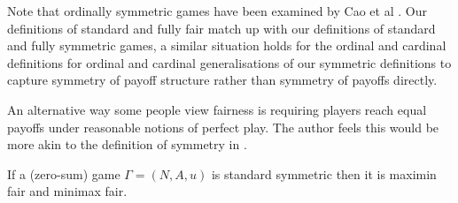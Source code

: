 Note that ordinally symmetric games have been examined by Cao et al \cite{cao2018symmetric, cao2019ordinally}. Our definitions of standard and fully fair match up with our definitions of standard and fully symmetric games, a similar situation holds for the ordinal and cardinal definitions for ordinal and cardinal generalisations of our symmetric definitions to capture symmetry of payoff structure rather than symmetry of payoffs directly. 

An alternative way some people view fairness is requiring players reach equal payoffs under reasonable notions of perfect play. The author feels this would be more akin to the definition of symmetry in \cite{DMaskin}.

\begin{proposition} \label{prop:standsymgamesaremaxminandminmaxfair}
	If a (zero-sum) game $\Gamma = (N, A, u)$ is standard symmetric then it is maximin fair and minimax fair.
	

\end{proposition}
